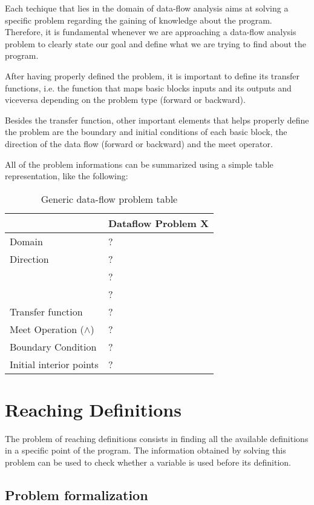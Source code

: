 \documentclass{article}
\begin{document}
 Each techique that lies in the domain of data-flow analysis aims at solving a specific problem regarding the gaining of knowledge about the program. Therefore, it is fundamental whenever we are approaching a data-flow analysis problem to clearly state our goal and define what we are trying to find about the program.

 After having properly defined the problem, it is important to define its transfer functions, i.e. the function that maps basic blocks inputs and its outputs and viceversa depending on the problem type (forward or backward).

 Besides the transfer function, other important elements that helps properly define the problem are the boundary and initial conditions of each basic block, the direction of the data flow (forward or backward) and the meet operator.

 All of the problem informations can be summarized using a simple table representation, like the following:

\begin{table}[H]
\centering
\begin{tabular}{|p{}|p{}|}
\hline
 & \textbf{Dataflow Problem X} \\
\hline
Domain & ? \\
\hline
Direction & ? \\
 & ? \\
 & ? \\
\hline
Transfer function & ? \\
\hline
Meet Operation ($\wedge$) & ? \\
\hline
Boundary Condition & ? \\
\hline
Initial interior points & ? \\
\hline
\end{tabular}
\caption{Generic data-flow problem table}
\label{tab:dataflow_problem_x}
\end{table}

\section{Reaching Definitions}

The problem of reaching definitions consists in finding all the available definitions in a specific point of the program. The information obtained by solving this problem can be used to check whether a variable is used before its definition.

\subsection{Problem formalization}
\end{document}
